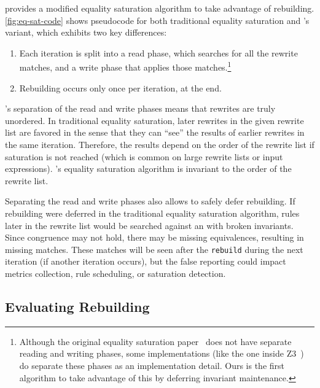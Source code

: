 \egg provides a modified equality saturation algorithm to take advantage
  of rebuilding.
\autoref{fig:eq-sat-code} shows pseudocode for both traditional equality
  saturation and \egg's variant, which exhibits two key differences:
\begin{enumerate}
  \item Each iteration is split into a read phase, which searches for all the
        rewrite matches, and a write phase that applies those matches.\footnote
    {
      Although the original equality saturation paper~\cite{eqsat}
      does not have separate reading and writing phases,
      some \egraph implementations (like the one inside Z3~\cite{z3})
      do separate these phases as an implementation detail.
      Ours is the first algorithm to take advantage of this by deferring
      invariant maintenance.
    }
  \item Rebuilding occurs only once per iteration, at the end.
\end{enumerate}

\egg's separation of the read and write phases means that rewrites are truly
  unordered.
In traditional equality saturation, later rewrites in the given rewrite list are
  favored in the sense that they can ``see'' the results of earlier rewrites in
  the same iteration.
Therefore, the results depend on the order of the rewrite list
  if saturation is not reached (which is common on large rewrite lists or input
  expressions).
\egg's equality saturation algorithm is invariant to the order of the rewrite
  list.

Separating the read and write phases also allows \egg to safely defer rebuilding.
If rebuilding were deferred in the traditional equality saturation algorithm,
  rules later in the rewrite list would be searched against an \egraph with
  broken invariants.
Since congruence may not hold, there may be missing equivalences, resulting in
  missing matches.
These matches will be seen after the \texttt{rebuild} during the next iteration
  (if another iteration occurs), but the false reporting could impact metrics
  collection, rule scheduling,\footnotemark{} or saturation detection.

\subsection{Evaluating Rebuilding}
\label{sec:rebuild-eval}

